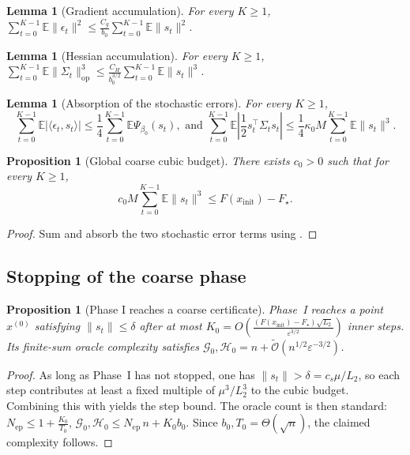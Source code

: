 \documentclass{article}
\theoremstyle{plain}
\newtheorem{proposition}[theorem]{Proposition}
\newtheorem{lemma}[theorem]{Lemma}
\theoremstyle{definition}
\theoremstyle{remark}
\begin{document}
\begin{lemma}[Gradient accumulation]\label{lem:g-main}
For every \(K\ge 1\), $\sum_{t=0}^{K-1}\mathbb E\|\epsilon_t\|^2
\le
\frac{C_g}{b_0}\sum_{t=0}^{K-1}\mathbb E\|s_t\|^2$.
\end{lemma}

\begin{lemma}[Hessian accumulation]\label{lem:h-main}
For every \(K\ge 1\), $\sum_{t=0}^{K-1}\mathbb E\|\Sigma_t\|_{\mathrm{op}}^3
\le
\frac{C_H}{b_0^{3/2}}\sum_{t=0}^{K-1}\mathbb E\|s_t\|^3$.
\end{lemma}

\begin{lemma}[Absorption of the stochastic errors]\label{lem:absorb-main}
For every \(K\ge 1\),
\[
\textstyle \sum_{t=0}^{K-1}\mathbb E|\langle \epsilon_t,s_t\rangle|
\le
\frac14\sum_{t=0}^{K-1}\mathbb E \Psi_{\beta_0}(s_t),\text{ and }
\sum_{t=0}^{K-1}\mathbb E\left|\frac12 s_t^\top \Sigma_t s_t\right|
\le
\frac14\kappa_0 M\sum_{t=0}^{K-1}\mathbb E\|s_t\|^3.
\]
\end{lemma}

\begin{proposition}[Global coarse cubic budget]\label{prop:budget-main}
There exists \(c_0>0\) such that for every \(K\ge 1\),
\[
\textstyle c_0 M \sum_{t=0}^{K-1}\mathbb E\|s_t\|^3
\le
F(x_{\mathrm{init}})-F_\star.
\]
\end{proposition}

\begin{proof}
Sum  and absorb the two stochastic error terms using .
\end{proof}

\subsection{Stopping of the coarse phase}

\begin{proposition}[Phase I reaches a coarse certificate]\label{prop:phase1}
Phase~I reaches a point \(x^{(0)}\) satisfying \(\|s_t\|\le \delta\) after at most $K_0
=
O\!\left(\frac{(F(x_{\mathrm{init}})-F_\star)\sqrt{L_2}}{\varepsilon^{3/2}}\right)$ inner steps. Its finite-sum oracle complexity satisfies $\mathcal G_0,\mathcal H_0
=
n+\widetilde{\mathcal O}\!\left(n^{1/2}\varepsilon^{-3/2}\right)$.
\end{proposition}

\begin{proof}
As long as Phase~I has not stopped, one has \(\|s_t\|>\delta=c_s\mu/L_2\), so each step contributes at least a fixed multiple of \(\mu^3/L_2^3\) to the cubic budget. Combining this with  yields the step bound. The oracle count is then standard:
$
N_{\mathrm{ep}}\le 1+\frac{K_0}{T_0}$,
$\mathcal G_0,\mathcal H_0
\le
N_{\mathrm{ep}}\,n+K_0b_0$.
Since \(b_0,T_0=\Theta(\sqrt n)\), the claimed complexity follows.
\end{proof}
\end{document}

